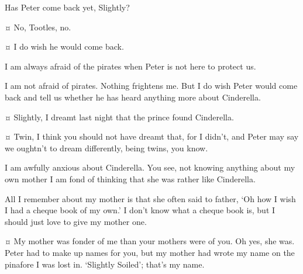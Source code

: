 \begin{drama}

\tootlesspeaks
Has Peter come back yet, Slightly?

\slightlyspeaks {}¤
No, Tootles, no.


\curlyspeaks {}¤
I do wish he would come back.

\tootlesspeaks
I am always afraid of the pirates when Peter is not here to protect us.

\slightlyspeaks
I am not afraid of pirates.
Nothing frightens me.
But I do wish Peter would come back and tell us whether he has heard anything more about Cinderella.

\secondtwinspeaks {}¤
Slightly, I dreamt last night that the prince found Cinderella.

\firsttwinspeaks {}¤
Twin, I think you should not have dreamt that, for I didn’t,
and Peter may say we oughtn’t to dream differently, being twins, you know.

\tootlesspeaks
I am awfully anxious about Cinderella.
You see, not knowing anything about my own mother I am fond of thinking that she was rather like Cinderella.


\nibsspeaks
All I remember about my mother is that she often said to father, ‘Oh how I wish I had a cheque book of my own.’
I don’t know what a cheque book is, but I should just love to give my mother one.

\slightlyspeaks {}¤
My mother was fonder of me than your mothers were of you.
Oh yes, she was.
Peter had to make up names for you, but my mother had wrote my name on the pinafore I was lost in.
‘Slightly Soiled’; that’s my name.

\end{drama}


